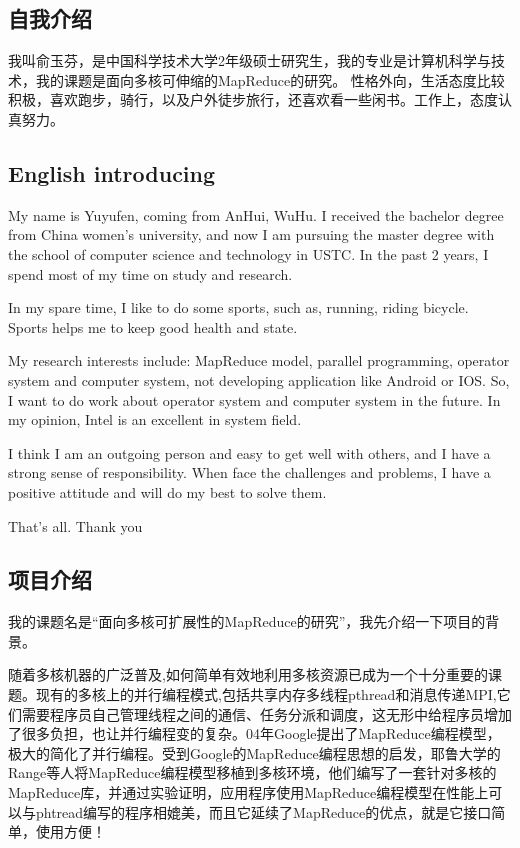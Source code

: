 \subsection{自我介绍}
我叫俞玉芬，是中国科学技术大学2年级硕士研究生，我的专业是计算机科学与技术，我的课题是面向多核可伸缩的MapReduce的研究。
性格外向，生活态度比较积极，喜欢跑步，骑行，以及户外徒步旅行，还喜欢看一些闲书。工作上，态度认真努力。

\subsection{English introducing}
My name is Yuyufen, coming from AnHui, WuHu. I received the bachelor degree from China
women's university, and now I am pursuing the master degree with the school of computer science and technology in USTC. In the past 2 years, I spend most of my time on study and research.

In my spare time, I like to do some sports, such as, running, riding bicycle. Sports helps me to keep good health and state.

My research interests include: MapReduce model, parallel programming, operator system and computer system, not developing application like Android or IOS. So, I want to do work about operator system and computer system in the future. In my opinion, Intel is an excellent in system field.

I think I am an outgoing person and easy to get well with others, and I have a strong sense of responsibility. When face the challenges and problems, I have a positive attitude and will do my best to solve them.

That’s all. Thank you


\subsection{项目介绍}
我的课题名是“面向多核可扩展性的MapReduce的研究”，我先介绍一下项目的背景。

随着多核机器的广泛普及,如何简单有效地利用多核资源已成为一个十分重要的课题。现有的多核上的并行编程模式,包括共享内存多线程pthread和消息传递MPI,它们需要程序员自己管理线程之间的通信、任务分派和调度，这无形中给程序员增加了很多负担，也让并行编程变的复杂。04年Google提出了MapReduce编程模型，极大的简化了并行编程。受到Google的MapReduce编程思想的启发，耶鲁大学的Range等人将MapReduce编程模型移植到多核环境，他们编写了一套针对多核的MapReduce库，并通过实验证明，应用程序使用MapReduce编程模型在性能上可以与phtread编写的程序相媲美，而且它延续了MapReduce的优点，就是它接口简单，使用方便！

